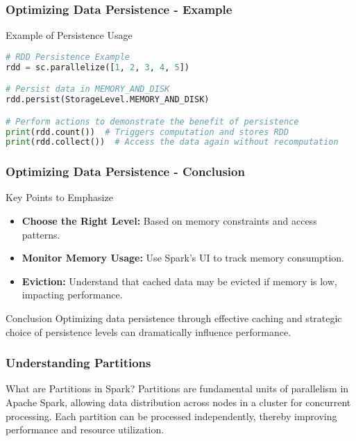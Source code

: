 \documentclass[aspectratio=169]{beamer}
\begin{document}
\begin{frame}[fragile]
    \frametitle{Optimizing Data Persistence - Example}
    \begin{block}{Example of Persistence Usage}
        \begin{lstlisting}[language=Python]
# RDD Persistence Example
rdd = sc.parallelize([1, 2, 3, 4, 5])

# Persist data in MEMORY_AND_DISK
rdd.persist(StorageLevel.MEMORY_AND_DISK)

# Perform actions to demonstrate the benefit of persistence
print(rdd.count())  # Triggers computation and stores RDD
print(rdd.collect())  # Access the data again without recomputation
        \end{lstlisting}
    \end{block}
\end{frame}

\begin{frame}[fragile]
    \frametitle{Optimizing Data Persistence - Conclusion}
    \begin{block}{Key Points to Emphasize}
        \begin{itemize}
            \item \textbf{Choose the Right Level:} Based on memory constraints and access patterns.
            \item \textbf{Monitor Memory Usage:} Use Spark's UI to track memory consumption.
            \item \textbf{Eviction:} Understand that cached data may be evicted if memory is low, impacting performance.
        \end{itemize}
    \end{block}
    \begin{block}{Conclusion}
        Optimizing data persistence through effective caching and strategic choice of persistence levels can dramatically influence performance.
    \end{block}
\end{frame}

\begin{frame}[fragile]
    \frametitle{Understanding Partitions}
    \begin{block}{What are Partitions in Spark?}
        Partitions are fundamental units of parallelism in Apache Spark, allowing data distribution across nodes in a cluster for concurrent processing. Each partition can be processed independently, thereby improving performance and resource utilization.
    \end{block}
\end{frame}
\end{document}
